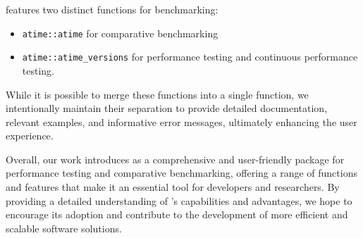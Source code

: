  features two distinct functions for benchmarking: 
\begin{itemize}
 
    \item\texttt{atime::atime} for comparative benchmarking \item\texttt{atime::atime\_versions} for performance testing and continuous performance testing. 

\end{itemize}

While it is possible to merge these functions into a single function, we intentionally maintain their separation to provide detailed documentation, relevant examples, and informative error messages, ultimately enhancing the user experience.

Overall, our work introduces  as a comprehensive and user-friendly package for performance testing and comparative benchmarking, offering a range of functions and features that make it an essential tool for developers and researchers. By providing a detailed understanding of 's capabilities and advantages, we hope to encourage its adoption and contribute to the development of more efficient and scalable software solutions.



